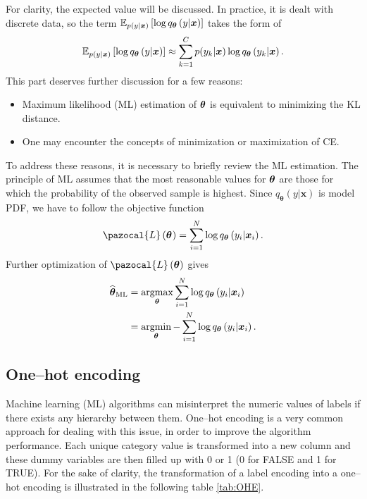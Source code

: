 For clarity, the expected value will be discussed. In practice, it is dealt with discrete data, so the term $\mathbb{E}_{ p(y| \boldsymbol{x})}\left[\log q_{\boldsymbol{\theta}}\left(y|\boldsymbol{x}\right)\right]$ takes the form of
\begin{equation}
    \mathbb{E}_{p(y| \boldsymbol{x})}\left[\log q_{\boldsymbol{\theta}}\left(y|\boldsymbol{x}\right)\right] \approx \sum_{k=1}^C p(y_k| \boldsymbol{x})\log q_{\boldsymbol{\theta}}\left(y_k|\boldsymbol{x}\right).
\end{equation}
This part deserves further discussion for a few reasons:
\begin{itemize}
    \item Maximum likelihood (ML) estimation  of $\boldsymbol{\theta}$ is equivalent to minimizing the KL distance.
    \item One may encounter the concepts of minimization or maximization of CE.
\end{itemize}
To address these reasons, it is necessary to briefly review the ML estimation. The principle of ML assumes that the most reasonable
values for $\boldsymbol{\theta}$ are those for which the probability of the observed sample is
highest. Since $q_{\boldsymbol{\theta}}\left(y|\boldsymbol{x}\right)$ is model PDF, we have to follow the objective function
\begin{equation}
   \pazocal{L}\left(\bt^{}\right)= \sum_{i=1}^{N}\log q_{\boldsymbol{\theta}}\left(y_i|\boldsymbol{x}_i\right).
\end{equation}
Further optimization of $\pazocal{L}\left(\bt\right)$ gives 
\begin{align}
    \widehat{\boldsymbol{\theta}}_{\mathrm{ML}} &= \mathop{\mathrm{argmax}}_{\boldsymbol{\theta}} \sum_{i=1}^{N}\log q_{\boldsymbol{\theta}}\left(y_i|\boldsymbol{x}_i\right)\\  
    &=\mathop{\mathrm{argmin}}_{\boldsymbol{\theta}} -\sum_{i=1}^{N}\log q_{\boldsymbol{\theta}}\left(y_i|\boldsymbol{x}_i\right).
\end{align}

\subsection{One--hot encoding}\label{OHE}
 Machine learning (ML) algorithms can misinterpret the numeric values of labels if there exists any hierarchy between them. One--hot encoding is a very common approach for dealing with this issue, in order to improve the algorithm performance. Each unique category value is transformed into a new column and these dummy variables are then filled up with 0 or 1 (0 for FALSE and 1 for TRUE). For the sake of clarity, the transformation of a label encoding into a one--hot encoding is illustrated in the following table \ref{tab:OHE}. 
 
